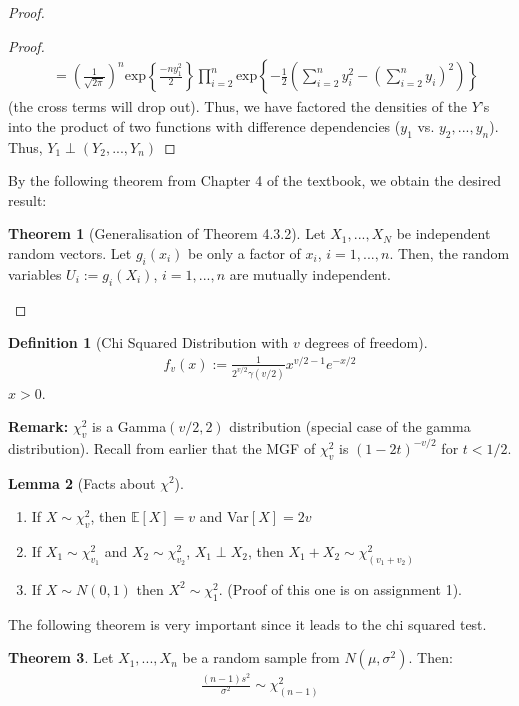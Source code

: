 \documentclass[11pt]{scrartcl}
\theoremstyle{definition}
\newtheorem{theorem}{Theorem}
\newtheorem{lemma}[theorem]{Lemma}
\newtheorem{definition}{Definition}
\theoremstyle{remark}
\newcommand{\EX}[1]{\mathbb{E}\left[#1 \right]}
\begin{document}
\begin{proof}
\begin{proof}
\begin{align*}
			& = \left( 	\frac{1}{\sqrt{2 \pi}}	\right)^n \text{exp} \left\{ 	\frac{-n y_1^2}{2}	\right\} \prod_{i=2}^n \text{exp} \left\{ 	-\frac{1}{2} \left( \sum_{i=2}^n y_i^2 - \left( 	\sum_{i=2}^n y_i \right)^2			\right) 	\right\} 
	\end{align*}
	(the cross terms will drop out). Thus, we have factored the densities of the $Y$'s into the product of two functions with difference dependencies ($y_1$ vs. $y_2, ..., y_n$). 
	Thus, $Y_1 \perp (Y_2, ..., Y_n)$ 
	\end{proof}
	By the following theorem from Chapter 4 of the textbook, we obtain the desired result: 
	\begin{theorem}[Generalisation of Theorem 4.3.2]
			Let $X_1, ..., X_N$ be independent random vectors. Let $g_i(x_i)$ be only a factor of $x_i$, $i=1,..., n$. Then, the random variables $U_i := g_i(X_i)$, $i=1,..., n$ are mutually independent. 
	\end{theorem}
\end{proof}

\begin{definition}[Chi Squared Distribution with $v$ degrees of freedom] 
	\begin{align}
		f_v(x) := \frac{1}{2^{v/2} \gamma (v/2) } x^{v/2 - 1} e^{-x/2} 
	\end{align}
	$x > 0$. 
\end{definition}

\textbf{Remark:} $\chi^2_v$ is a Gamma$(v/2, 2)$ distribution (special case of the gamma distribution). Recall from earlier that the MGF of $\chi_v^2$ is $(1-2t)^{-v/2}$ for $t < 1/2$. 

\begin{lemma}[Facts about $\chi^2$]
	\begin{enumerate}[noitemsep]
		\item  If $X \sim \chi_v^2$, then $\EX{X} = v$ and Var$[X] = 2v$
		\item If $X_1 \sim \chi^2_{v_1}$ and $X_2 \sim \chi^2_{v_2}$, $X_1 \perp X_2$, then $X_1 + X_2 \sim \chi^2_{(v_1 + v_2)}$ 
		\item If $X \sim N(0,1)$ then $X^2 \sim \chi^2_1$. (Proof of this one is on assignment 1). 
	\end{enumerate}
\end{lemma}

The following theorem is very important since it leads to the chi squared test. 

\begin{theorem}
	Let $X_1, ..., X_n$ be a random sample from $N(\mu, \sigma^2)$. Then: 
	\begin{align} 
		\frac{(n-1)s^2}{\sigma^2} \sim \chi^2_{(n-1)}	
	\end{align} 
\end{theorem}
\end{document}
